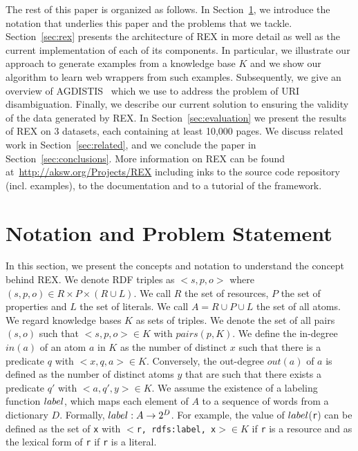 The rest of this paper is organized as follows. In Section~\ref{sec:notation}, we introduce the notation that underlies this paper and the problems that we tackle. Section~\ref{sec:rex} presents the architecture of REX in more detail as well as the current implementation of each of its components.
In particular, we illustrate our approach to generate examples from a knowledge base $K$ and we show our algorithm to learn web wrappers from such examples.
Subsequently, we give an overview of AGDISTIS~\cite{Usbeck2014} which we use to address the problem of URI disambiguation. 
Finally, we describe our current solution to ensuring the validity of the data generated by REX. 
In Section~\ref{sec:evaluation} we present the results of REX on 3 datasets, each containing at least 10,000 pages. 
We discuss related work in Section~\ref{sec:related}, and we conclude the paper in Section~\ref{sec:conclusions}. 
More information on REX can be found at~\url{http://aksw.org/Projects/REX} including inks to the source code repository (incl. examples), to the documentation and to a tutorial of the framework.

\section{Notation and Problem Statement}
\label{sec:notation}
In this section, we present the concepts and notation to understand the concept behind REX. We denote RDF triples as $<s, p, o>$ where $(s, p, o) \in R \times P \times (R \cup L)$. We call $R$ the set of resources, $P$ the set of properties and $L$ the set of literals. We call $A = R \cup P \cup L$ the set of all atoms. We regard knowledge bases $K$ as sets of triples. We denote the set of all pairs $(s, o)$ such that $<s, p, o> \in K$ with $pairs(p, K)$.
We define the in-degree $in(a)$ of an atom $a$ in $K$ as the number of distinct $x$ such that there is a predicate $q$ with $<x, q, a> \in K$. Conversely, the out-degree $out(a)$ of $a$ is defined as the number of distinct atoms $y$ that are such that there exists a predicate $q'$ with $<a, q', y> \in K$.
We assume the existence of a labeling function $label$, which maps each element of $A$ to a sequence of words from a dictionary $D$. Formally, $label: A \rightarrow 2^D$. For example, the value of $label$(\texttt{r}) can be defined as the set of \texttt{x} with $<$\texttt{r, rdfs:label, x}$> \in K$ if \texttt{r} is a resource and as the lexical form of  \texttt{r} if  \texttt{r} is a literal.

